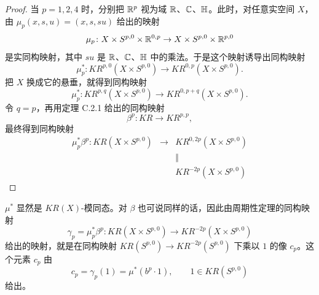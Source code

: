 \begin{proof}
  当 $p=1,2,4$ 时，分别把 $\mathbb{R}^p$ 视为域 $\mathbb{R}$、$\mathbb{C}$、$\mathbb{H}$。此时，对任意实空间 $X$，由 $\mu_p(x,s,u)=(x,s,su)$ 给出的映射
\[
\mu_p\colon X\times S^{p,0}\times\mathbb{R}^{0,p}\to X\times S^{p,0}\times\mathbb{R}^{p,0}
\]
是实同构映射，其中 $su$ 是 $\mathbb{R}$、$\mathbb{C}$、$\mathbb{H}$ 中的乘法。于是这个映射诱导出同构映射
\[
\mu_p^*\colon KR^{p,0}(X\times S^{p,0})\to KR^{0,p}(X\times S^{p,0}).
\]
把 $X$ 换成它的悬垂，就得到同构映射
\[
\mu_p^*\colon KR^{p,q}(X\times S^{p,0})\to KR^{0,p+q}(X\times S^{p,0}).
\]
令 $q=p$，再用定理 C.2.1 给出的同构映射
\[
\beta^p\colon KR\to KR^{p,p},
\]
最终得到同构映射
\[
\begin{array}{ccc}
\mu_p^*\beta^p\colon KR(X\times S^{p,0}) & \longrightarrow & KR^{0,2p}(X\times S^{p,0})\\
& & \Vert\\
& & KR^{-2p}(X\times S^{p,0})
\end{array}
\]
\end{proof}

\begin{remark}{}
  $\mu^*$ 显然是 $KR(X)$-模同态。对 $\beta$ 也可说同样的话，因此由周期性定理的同构映射
\[
\gamma_p=\mu_p^*\beta^p\colon KR(X\times S^{p,0})\to KR^{-2p}(X\times S^{p,0})
\]
给出的映射，就是在同构映射 $KR(S^{p,0})\to KR^{-2p}(S^{p,0})$ 下乘以 $1$ 的像 $c_p$。这个元素 $c_p$ 由
\[
c_p=\gamma_p(1)=\mu^*(b^p\cdot1),\qquad 1\in KR(S^{p,0})
\]
给出。
\end{remark}

